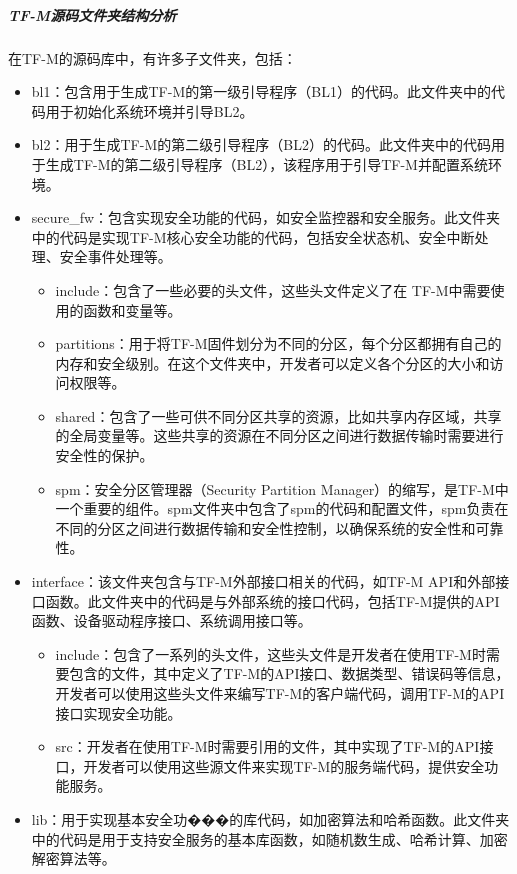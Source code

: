 \documentclass[12pt,a4paper]{ctexart}
\numberwithin{figure}{section}
\begin{document}
\subparagraph{TF-M源码文件夹结构分析}
\par 在TF-M的源码库中，有许多子文件夹，包括：
\begin{itemize}
    \item bl1：包含用于生成TF-M的第一级引导程序（BL1）的代码。此文件夹中的代码用于初始化系统环境并引导BL2。
    \item bl2：用于生成TF-M的第二级引导程序（BL2）的代码。此文件夹中的代码用于生成TF-M的第二级引导程序（BL2），该程序用于引导TF-M并配置系统环境。
    \item secure\_fw：包含实现安全功能的代码，如安全监控器和安全服务。此文件夹中的代码是实现TF-M核心安全功能的代码，包括安全状态机、安全中断处理、安全事件处理等。
          \begin{itemize}
              \item include：包含了一些必要的头文件，这些头文件定义了在    TF-M中需要使用的函数和变量等。
              \item partitions：用于将TF-M固件划分为不同的分区，每个分区都拥有自己的内存和安全级别。在这个文件夹中，开发者可以定义各个分区的大小和访问权限等。
              \item shared：包含了一些可供不同分区共享的资源，比如共享内存区域，共享的全局变量等。这些共享的资源在不同分区之间进行数据传输时需要进行安全性的保护。
              \item spm：安全分区管理器（Security Partition Manager）的缩写，是TF-M中一个重要的组件。spm文件夹中包含了spm的代码和配置文件，spm负责在不同的分区之间进行数据传输和安全性控制，以确保系统的安全性和可靠性。
          \end{itemize}
    \item interface：该文件夹包含与TF-M外部接口相关的代码，如TF-M API和外部接口函数。此文件夹中的代码是与外部系统的接口代码，包括TF-M提供的API函数、设备驱动程序接口、系统调用接口等。
          \begin{itemize}
              \item include：包含了一系列的头文件，这些头文件是开发者在使用TF-M时需要包含的文件，其中定义了TF-M的API接口、数据类型、错误码等信息，开发者可以使用这些头文件来编写TF-M的客户端代码，调用TF-M的API接口实现安全功能。
              \item src：开发者在使用TF-M时需要引用的文件，其中实现了TF-M的API接口，开发者可以使用这些源文件来实现TF-M的服务端代码，提供安全功能服务。
          \end{itemize}
    \item lib：用于实现基本安全功���的库代码，如加密算法和哈希函数。此文件夹中的代码是用于支持安全服务的基本库函数，如随机数生成、哈希计算、加密解密算法等。

\end{itemize}
\end{document}
